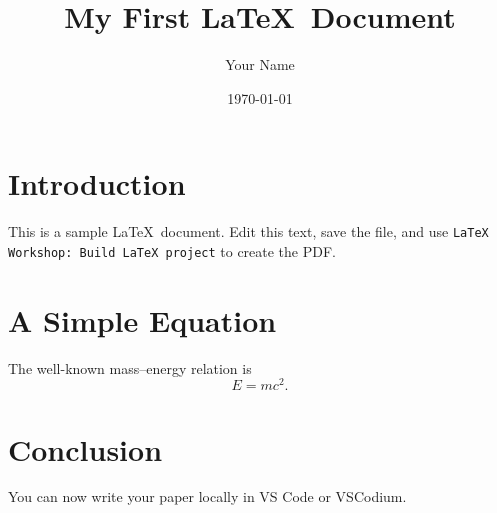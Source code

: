 \documentclass[12pt,a4paper]{article}
\title{My First \LaTeX\ Document}
\author{Your Name}
\date{\today}
\begin{document}
\maketitle

\section{Introduction}

This is a sample \LaTeX\ document. Edit this text, save the file, and use
\texttt{LaTeX Workshop: Build LaTeX project} to create the PDF.

\section{A Simple Equation}

The well-known mass--energy relation is
\begin{equation}
    E = mc^2.
\end{equation}

\section{Conclusion}

You can now write your paper locally in VS Code or VSCodium.
\end{document}
